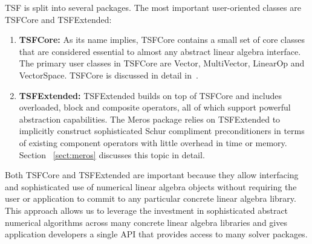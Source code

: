 \documentclass[acmtoms,acmnow]{acmtrans2m}
\begin{document}
TSF is split into several packages.  The most important user-oriented
classes are TSFCore and TSFExtended:
\begin{enumerate}
\item {\bf TSFCore:} As its name implies, TSFCore contains a small set
of core classes that are considered essential to almost any abstract
linear algebra interface.  The primary user classes in TSFCore are
Vector, MultiVector, LinearOp and VectorSpace. TSFCore is discussed in
detail in~\cite{TSFCore}.
\item {\bf TSFExtended:} TSFExtended builds on top of TSFCore and
includes overloaded, block and composite operators, all of
which support powerful abstraction capabilities.  The Meros package
relies on TSFExtended to implicitly construct sophisticated
Schur compliment preconditioners in terms of existing component
operators with little overhead in time or memory.  Section
~\ref{sect:meros} discusses this topic in detail.
\end{enumerate}

Both TSFCore and TSFExtended are important because they allow
interfacing and sophisticated use of numerical linear algebra objects
without requiring the user or application to commit to any particular
concrete linear algebra library.  This approach allows us to leverage
the investment in sophisticated abstract numerical algorithms across
many concrete linear algebra libraries and gives application
developers a single API that provides access to many solver packages.


%
%
%
%
\end{document}
